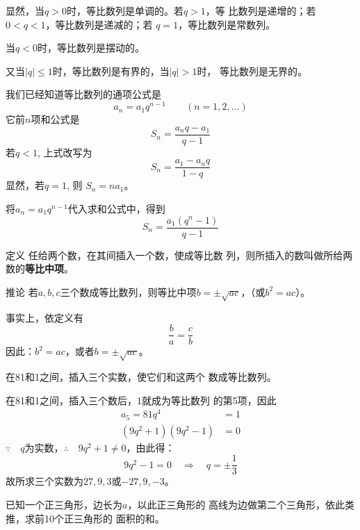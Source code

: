显然，当$q>0$时，等比数列是单调的。若$q>1$，等
比数列是递增的；若$0<q<1$，等比数列是递减的；若
$q=1$，等比数列是常数列。

当$q<0$时，等比数列是摆动的。

又当$|q|\le 1$时，等比数列是有界的，当$|q|>1$时，
等比数列是无界的。

我们已经知道等比数列的通项公式是
\[a_n=a_1q^{n-1}\qquad (n=1,2,\ldots)\]
它前$n$项和公式是
\[S_n=\frac{a_nq-a_1}{q-1}\]
若$q<1$, 上式改写为
\[S_n=\frac{a_1-a_nq}{1-q}\]
显然，若$q=1$, 则 $S_n=na_1$。

将$a_n=a_1q^{n-1}$代入求和公式中，得到
\[S_n=\frac{a_1(q^n-1)}{q-1}\]

\begin{blk}{定义}
    任给两个数，在其间插入一个数，使成等比数
列，则所插入的数叫做所给两数的\textbf{等比中项}。
\end{blk}

\begin{blk}{推论}
    若$a,b,c$三个数成等比数列，则等比中项$b=\pm\sqrt{ac}$，（或$b^2=ac$）。    
\end{blk}

事实上，依定义有$$\frac{b}{a}=\frac{c}{b}$$
因此：$b^2=ac$，或者$b=\pm\sqrt{ac}$。

\begin{example}
    在81和1之间，插入三个实数，使它们和这两个
数成等比数列。
\end{example}

\begin{solution}
    在81和1之间，插入三个数后，1就成为等比数列
的第5项，因此
\[\begin{split}
  a_5=81q^4&=1\\
  (9q^2+1)(9q^2-1)&=0  
\end{split}\]
$\because\quad q$为实数，$\therefore\quad 9q^2+1\ne 0$，由此得：
\[9q^2-1=0\quad \Rightarrow\quad q=\pm\frac{1}{3}\]
故所求三个实数为$27,9,3$或$-27,9,-3$。
\end{solution}


\begin{example}
    已知一个正三角形，边长为$a$，以此正三角形的
高线为边做第二个三角形，依此类推，求前10个正三角形的
面积的和。
\end{example}

\begin{figure}[htp]
    \centering
{}
    \caption{}
\end{figure}


